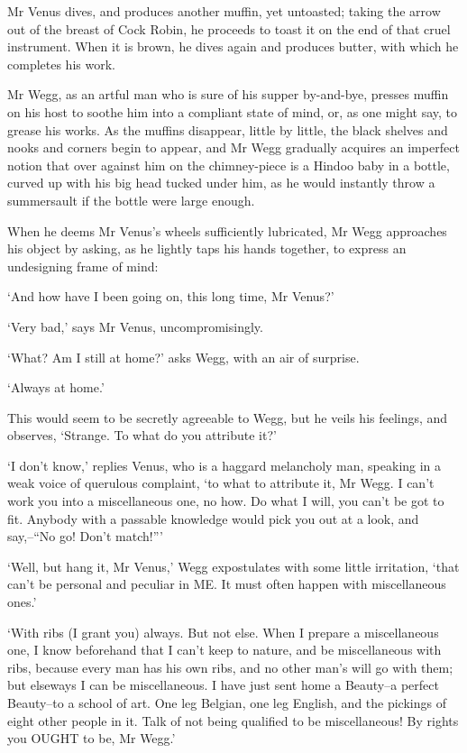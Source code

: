Mr Venus dives, and produces another muffin, yet untoasted; taking the
arrow out of the breast of Cock Robin, he proceeds to toast it on the
end of that cruel instrument. When it is brown, he dives again and
produces butter, with which he completes his work.

Mr Wegg, as an artful man who is sure of his supper by-and-bye, presses
muffin on his host to soothe him into a compliant state of mind, or, as
one might say, to grease his works. As the muffins disappear, little by
little, the black shelves and nooks and corners begin to appear, and Mr
Wegg gradually acquires an imperfect notion that over against him on the
chimney-piece is a Hindoo baby in a bottle, curved up with his big
head tucked under him, as he would instantly throw a summersault if the
bottle were large enough.

When he deems Mr Venus’s wheels sufficiently lubricated, Mr Wegg
approaches his object by asking, as he lightly taps his hands together,
to express an undesigning frame of mind:

‘And how have I been going on, this long time, Mr Venus?’

‘Very bad,’ says Mr Venus, uncompromisingly.

‘What? Am I still at home?’ asks Wegg, with an air of surprise.

‘Always at home.’

This would seem to be secretly agreeable to Wegg, but he veils his
feelings, and observes, ‘Strange. To what do you attribute it?’

‘I don’t know,’ replies Venus, who is a haggard melancholy man, speaking
in a weak voice of querulous complaint, ‘to what to attribute it, Mr
Wegg. I can’t work you into a miscellaneous one, no how. Do what I will,
you can’t be got to fit. Anybody with a passable knowledge would pick
you out at a look, and say,--“No go! Don’t match!”’

‘Well, but hang it, Mr Venus,’ Wegg expostulates with some little
irritation, ‘that can’t be personal and peculiar in ME. It must often
happen with miscellaneous ones.’

‘With ribs (I grant you) always. But not else. When I prepare a
miscellaneous one, I know beforehand that I can’t keep to nature, and
be miscellaneous with ribs, because every man has his own ribs, and no
other man’s will go with them; but elseways I can be miscellaneous. I
have just sent home a Beauty--a perfect Beauty--to a school of art. One
leg Belgian, one leg English, and the pickings of eight other people in
it. Talk of not being qualified to be miscellaneous! By rights you OUGHT
to be, Mr Wegg.’

